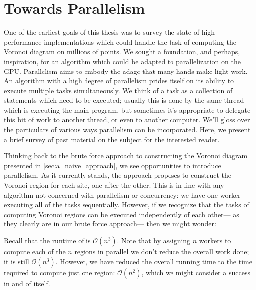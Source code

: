 \documentclass[12pt,twoside]{reedthesis}
\begin{document}
  
  \chapter{Towards Parallelism}


    One of the earliest goals of this thesis was to survey the state of high performance implementations which could handle the task of computing the Voronoi diagram on millions of points. We sought a foundation, and perhaps, inspiration, for an algorithm which could be adapted to parallelization on the GPU. Parallelism aims to embody the adage that many hands make light work. An algorithm with a high degree of parallelism prides itself on its ability to execute multiple tasks simultaneously. We think of a task as a collection of statements which need to be executed; usually this is done by the same thread which is executing the main program, but sometimes it's appropriate to delegate this bit of work to another thread, or even to another computer. We'll gloss over the particulars of various ways parallelism can be incorporated.  Here, we present a brief survey of past material on the subject for the interested reader.\par

    Thinking back to the brute force approach to constructing the Voronoi diagram presented in \cref{sec:a_naive_approach}, we see opportunities to introduce parallelism. As it currently stands, the approach proposes to construct the Voronoi region for each site, one after the other. This is in line with any algorithm not concerned with parallelism or concurrency: we have one worker executing all of the tasks sequentially. However, if we recognize that the tasks of computing Voronoi regions can be executed independently of each other--- as they clearly are in our brute force approach--- then we might wonder: \par

    Recall that the runtime of  is $\mathcal{O}(n^3)$. Note that by assigning $n$ workers to compute each of the $n$ regions in parallel we don't reduce the overall work done; it is still $\mathcal{O}(n^3)$. However, we have reduced the overall running time to the time required to compute just one region: $\mathcal{O}(n^2)$, which we might consider a success in and of itself.\par
\end{document}
